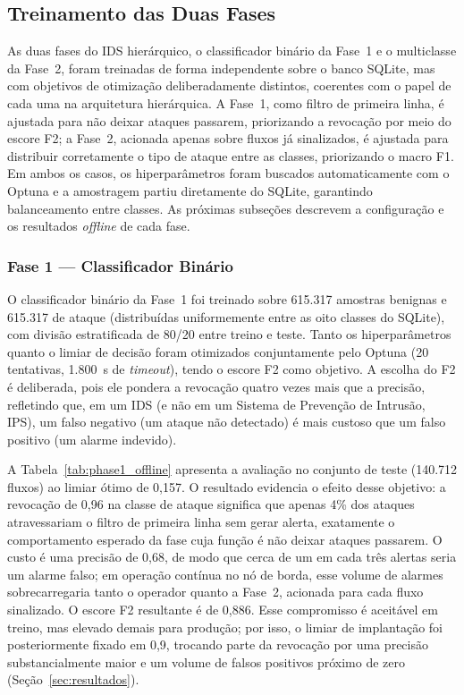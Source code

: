 \documentclass[12pt]{article}
\begin{document}
\subsection{Treinamento das Duas Fases}
\label{subsec:treinamento}

As duas fases do IDS hierárquico, o classificador binário da Fase~1 e o
multiclasse da Fase~2, foram treinadas de forma independente sobre o banco
SQLite, mas com objetivos de otimização deliberadamente distintos, coerentes com
o papel de cada uma na arquitetura hierárquica. A Fase~1, como filtro de primeira linha, é
ajustada para não deixar ataques passarem, priorizando a revocação por meio do
escore F2; a Fase~2, acionada apenas sobre fluxos já sinalizados, é ajustada para
distribuir corretamente o tipo de ataque entre as classes, priorizando o macro
F1. Em ambos os casos, os hiperparâmetros foram buscados automaticamente com o
Optuna e a amostragem partiu diretamente do SQLite, garantindo balanceamento
entre classes. As próximas subseções descrevem a configuração e os resultados
\textit{offline} de cada fase.

\subsubsection{Fase 1 — Classificador Binário}

O classificador binário da Fase~1 foi treinado sobre 615.317 amostras
benignas e 615.317 de ataque (distribuídas uniformemente entre as oito classes do
SQLite), com divisão estratificada de 80/20 entre treino e teste. Tanto os
hiperparâmetros quanto o limiar de decisão foram otimizados conjuntamente pelo
Optuna (20 tentativas, 1.800~s de \textit{timeout}), tendo o escore F2 como
objetivo. A escolha do F2 é deliberada, pois ele pondera a revocação quatro vezes
mais que a precisão, refletindo que, em um IDS (e não em um Sistema de Prevenção
de Intrusão, IPS), um falso negativo (um ataque não detectado) é mais custoso que
um falso positivo (um alarme indevido).

A Tabela~\ref{tab:phase1_offline} apresenta a avaliação no conjunto de teste
(140.712 fluxos) ao limiar ótimo de 0,157. O resultado evidencia o efeito desse
objetivo: a revocação de 0,96 na classe de ataque significa que apenas 4\% dos
ataques atravessariam o filtro de primeira linha sem gerar alerta, exatamente o
comportamento esperado da fase cuja função é não deixar ataques passarem. O
custo é uma precisão de 0,68, de modo que cerca de um em cada três alertas seria
um alarme falso; em operação contínua no nó de borda, esse volume de alarmes
sobrecarregaria tanto o operador quanto a Fase~2, acionada para cada fluxo
sinalizado. O escore F2 resultante é de 0,886. Esse compromisso é aceitável em
treino, mas elevado demais para produção; por isso, o limiar de implantação foi
posteriormente fixado em 0,9, trocando parte da revocação por uma precisão
substancialmente maior e um volume de falsos positivos próximo de zero
(Seção~\ref{sec:resultados}).
\end{document}
